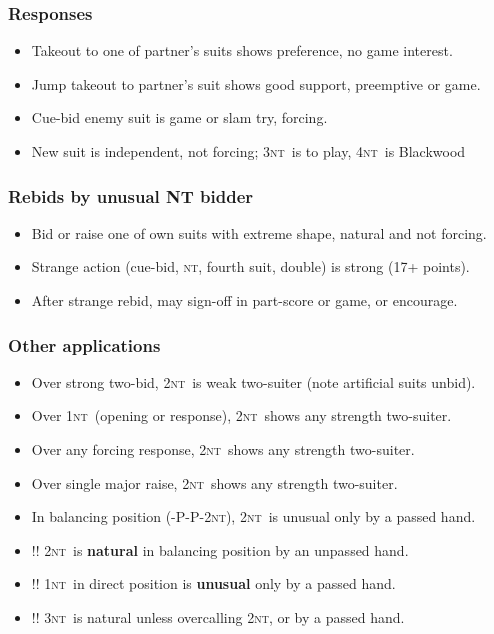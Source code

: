 \documentclass[10pt]{article}
\def\NT{\textsc{nt}}
\newenvironment{mylist}[1][.5]{\begin{itemize}\itemsep=-#1\baselineskip}{\end{itemize}}
\begin{document}
\subsubsection{Responses}
\begin{mylist}[.3]
\item Takeout to one of partner's suits shows preference, no game interest.
\item Jump takeout to partner's suit shows good support, preemptive or game.
\item Cue-bid enemy suit is game or slam try, forcing.
\item {\small New suit is independent, not forcing; 3\NT\ is to play, 4\NT\ is Blackwood}
\end{mylist}
\subsubsection{Rebids by unusual NT bidder}
\begin{mylist}[.3]
\item Bid or raise one of own suits with extreme shape, natural and not forcing.
\item Strange action (cue-bid, \NT, fourth suit, double) is strong (17+ points).
\item After strange rebid, may sign-off in part-score or game, or encourage.
\end{mylist}
\subsubsection{Other applications}
\begin{mylist}[.3]
\item Over strong two-bid, 2\NT\ is weak two-suiter (note artificial suits unbid).
\item Over 1\NT\ (opening or response), 2\NT\ shows any strength two-suiter.
\item Over any forcing response, 2\NT\ shows any strength two-suiter.
\item Over single major raise, 2\NT\ shows any strength two-suiter.
\item In balancing position (-P-P-2\NT), 2\NT\ is unusual only by a passed hand.
\item[!!] 2\NT\ is \textbf{natural} in balancing position by an unpassed hand.
\item[!!] 1\NT\ in direct position is \textbf{unusual} only by a passed hand.
\item[!!] 3\NT\ is natural unless overcalling 2\NT, or by a passed hand.
\end{mylist}
\end{document}
